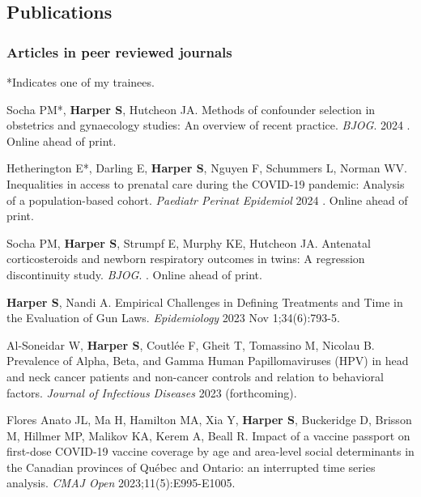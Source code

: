 \documentclass[
  letterpaper,
  DIV=11,
  numbers=noendperiod]{scrartcl}
\begin{document}
\subsection{Publications}\label{publications}

\subsubsection{Articles in peer reviewed
journals}\label{articles-in-peer-reviewed-journals}

*Indicates one of my trainees.

\begin{etaremune}

\item Socha PM*, \textbf{Harper S}, Hutcheon JA. Methods of confounder selection in obstetrics and gynaecology studies: An overview of recent practice. \emph{BJOG}. 2024 . Online ahead of print.
 
\item Hetherington E*, Darling E, \textbf{Harper S}, Nguyen F, Schummers L, Norman WV. Inequalities in access to prenatal care during the COVID-19 pandemic: Analysis of a population-based cohort. \emph{Paediatr Perinat Epidemiol} 2024 . Online ahead of print.

\item *Socha PM, \textbf{Harper S}, Strumpf E, Murphy KE, Hutcheon JA. Antenatal corticosteroids and newborn respiratory outcomes in twins: A regression discontinuity study. \emph{BJOG}. . Online ahead of print.

\item \textbf{Harper S}, Nandi A. Empirical Challenges in Defining Treatments and Time in the Evaluation of Gun Laws. \emph{Epidemiology} 2023 Nov 1;34(6):793-5. 

\item *Al-Soneidar W, \textbf{Harper S}, Coutlée F, Gheit T, Tomassino M, Nicolau B. Prevalence of Alpha, Beta, and Gamma Human Papillomaviruses (HPV) in head and neck cancer patients and non-cancer controls and relation to behavioral factors. \emph{Journal of Infectious Diseases} 2023 (forthcoming). 

\item Flores Anato JL, Ma H, Hamilton MA, Xia Y, \textbf{Harper S}, Buckeridge D, Brisson M, Hillmer MP, Malikov KA, Kerem A, Beall R. Impact of a vaccine passport on first-dose COVID-19 vaccine coverage by age and area-level social determinants in the Canadian provinces of Québec and Ontario: an interrupted time series analysis. \emph{CMAJ Open} 2023;11(5):E995-E1005. 


\end{etaremune}
\end{document}
